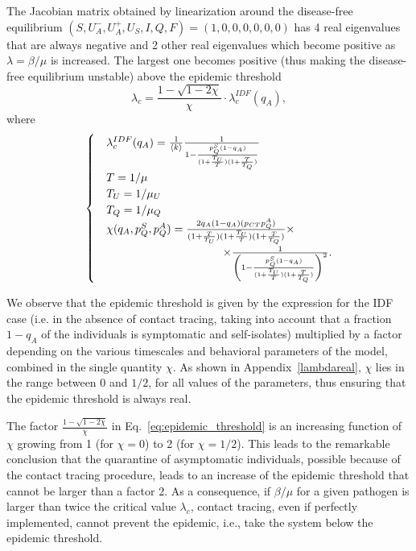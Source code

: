 \documentclass[aps,twocolumn,superscriptaddress,nofootinbib,pre,floatfix]{revtex4-1}
\begin{document}
The Jacobian matrix obtained by linearization around the disease-free
equilibrium
$(S, U_A^-, U_A^+, U_S, I, Q, F) = (1,0,0,0,0,0,0)$
has 4 real eigenvalues that are always negative and 2 other real
eigenvalues which
become positive as $\lambda=\beta/\mu$ is increased.
The largest one becomes positive (thus making the disease-free equilibrium
unstable) above the epidemic threshold
\begin{equation}
    \lambda_c = \frac{1 - \sqrt{1 - 2 \chi}}{\chi} \cdot \lambda_c^{IDF}(q_A),
    \label{eq:epidemic_threshold}
\end{equation}
where
\begin{align}
  \begin{cases}
    &\lambda_c^{IDF}(q_A) = \frac{1}{\langle k \rangle}
    \frac{1}{1 - \frac{p_Q^S (1-q_A)}{(1 + \frac{T_U}{T})(1 + \frac{T}{T_Q})}} \\
    &T=1/\mu\\
    &T_U=1/\mu_U\\
    &T_Q=1/\mu_Q\\
    &\chi (q_A, p_Q^S, p_Q^A) = \frac{2 q_A (1-q_A) (p_{CT} p_Q^A)}{(1 + \frac{T}{T_U})(1 + \frac{T_U}{T})(1 + \frac{T}{T_Q})} \times\\
    & \hspace{0.3 \linewidth} \times \frac{1}{\left(1 - \frac{p_Q^S (1-q_A)}{(1 + \frac{T_U}{T})(1 + \frac{T}{T_Q})}\right)^2}.
\end{cases}
\end{align}

We observe that the epidemic threshold is given by the expression
for the IDF case (i.e. in the absence of contact tracing, taking into
account that a fraction $1-q_A$ of the individuals is symptomatic and self-isolates)
multiplied
by a factor depending on the various timescales and behavioral
parameters of the model, combined in the single quantity $\chi$.
As shown in Appendix~\ref{lambdareal},
$\chi$ lies in the range between $0$ and $1/2$,
for all values of the parameters, thus
ensuring that the epidemic threshold is always real.

The factor $\frac{1-\sqrt{1-2\chi}}{\chi}$ in
Eq.~\eqref{eq:epidemic_threshold}
is an increasing function of $\chi$ growing from 1 (for $\chi=0$)
to 2 (for $\chi=1/2$).
This leads to the remarkable conclusion that the quarantine of asymptomatic
individuals, possible because of the contact tracing procedure,
leads to an increase of the epidemic threshold that cannot be
larger than a factor 2.
As a consequence, if $\beta/\mu$ for a given pathogen is larger
than twice the critical value $\lambda_c$, contact tracing,
even if perfectly implemented, cannot prevent the epidemic, i.e.,
take the system below the epidemic threshold.
\end{document}
